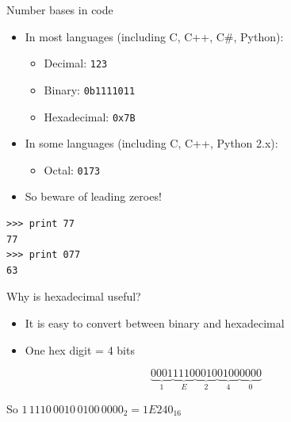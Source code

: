 \begin{frame}[fragile]{Number bases in code}
	\begin{itemize}
		\pause\item In most languages (including C, C++, C\#, Python):
			\begin{itemize}
				\pause\item Decimal: \texttt{123}
				\pause\item Binary: \texttt{0b1111011}
				\pause\item Hexadecimal: \texttt{0x7B}
			\end{itemize}
		\pause\item In some languages (including C, C++, Python 2.x):
			\begin{itemize}
				\pause\item Octal: \texttt{0173}
			\end{itemize}
		\pause\item So beware of leading zeroes!
	\end{itemize}
	\begin{lstlisting}
>>> print 77
77
>>> print 077
63
	\end{lstlisting}
\end{frame}

\begin{frame}{Why is hexadecimal useful?} 
	\begin{itemize}
		\pause\item It is easy to convert between binary and hexadecimal
		\pause\item One hex digit = 4 bits
	\end{itemize}
	
	\pause $$
	\underbrace{0001}_{1}
	\underbrace{1110}_{E}
	\underbrace{0010}_{2}
	\underbrace{0100}_{4}
	\underbrace{0000}_{0}
	$$
	
	\pause So $1\,1110\,0010\,0100\,0000_{2} = 1E240_{16}$
\end{frame}

